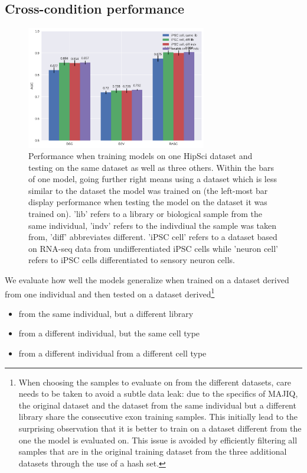\subsection{Cross-condition performance} \label{subsec:hipsci_ipsc_majiq}

\begin{figure}
	\centering\includegraphics[width=0.7\textwidth]{../visualizations/ch5-results/majiq_comparison_barcharts.png} 
	\caption{Performance when training models on one HipSci dataset and testing on the same dataset as well as three others. Within the bars of one model, going further right means using a dataset which is less similar to the dataset the model was trained on (the left-most bar display performance when testing the model on the dataset it was trained on). 'lib' refers to a library or biological sample from the same individual, 'indv' refers to the indivdiual the sample was taken from, 'diff' abbreviates different. 'iPSC cell' refers to a dataset based on RNA-seq data from undifferentiated iPSC cells while 'neuron cell' refers to iPSC cells differentiated to sensory neuron cells. }
	\label{fig:majiq_comparison_barcharts}
\end{figure}


We evaluate how well the models generalize when trained on a dataset derived from one individual and then tested on a dataset derived\footnote{When choosing the samples to evaluate on from the different datasets, care needs to be taken to avoid a subtle data leak: due to the specifics of MAJIQ, the original dataset and the dataset from the same individual but a different library share the consecutive exon training samples. This initially lead to the surprising observation that  it is better to train on a dataset different from the one the model is evaluated on. This issue is avoided by efficiently filtering all samples that are in the original training dataset from the three additional datasets through the use of a hash set.}
\begin{itemize}
	\item from the same individual, but a different library
	\item from a different individual, but the same cell type
	\item from a different individual from a different cell type
\end{itemize}


